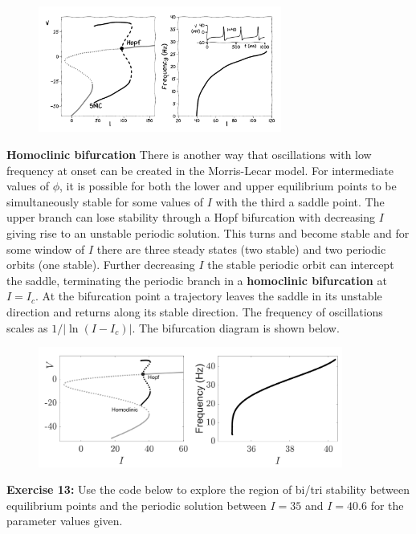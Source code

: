 \documentclass[11pt]{article}
\begin{document}
    \begin{figure}[!h]
  \centering
  \includegraphics[width=8cm]{SNICbif.png}
\end{figure}

    \textbf{Homoclinic bifurcation} There is another way that oscillations
with low frequency at onset can be created in the Morris-Lecar model.
For intermediate values of \(\phi\), it is possible for both the lower
and upper equilibrium points to be simultaneously stable for some values
of \(I\) with the third a saddle point. The upper branch can lose
stability through a Hopf bifurcation with decreasing \(I\) giving rise
to an unstable periodic solution. This turns and become stable and for
some window of \(I\) there are three steady states (two stable) and two
periodic orbits (one stable). Further decreasing \(I\) the stable
periodic orbit can intercept the saddle, terminating the periodic branch
in a \textbf{homoclinic bifurcation} at \(I=I_c\). At the bifurcation
point a trajectory leaves the saddle in its unstable direction and
returns along its stable direction. The frequency of oscillations scales
as \(1/|\ln(I-I_c)|\). The bifurcation diagram is shown below.

   \begin{figure}[!h]
  \centering
  \includegraphics[width=10cm]{MLhomoclinic.png}
\end{figure}

\textbf{Exercise 13:} Use the code below to explore the region of bi/tri
stability between equilibrium points and the periodic solution between
\(I=35\) and \(I=40.6\) for the parameter values given.
\end{document}
